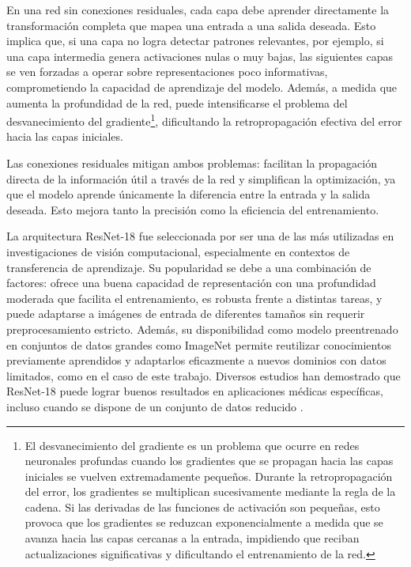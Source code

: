 En una red sin conexiones residuales, cada capa debe aprender directamente la transformación completa que mapea una entrada a una salida deseada. Esto implica que, si una capa no logra detectar patrones relevantes, por ejemplo, si una capa intermedia genera activaciones nulas o muy bajas, las siguientes capas se ven forzadas a operar sobre representaciones poco informativas, comprometiendo la capacidad de aprendizaje del modelo. Además, a medida que aumenta la profundidad de la red, puede intensificarse el problema del desvanecimiento del gradiente\footnote{El desvanecimiento del gradiente es un problema que ocurre en redes neuronales profundas cuando los gradientes que se propagan hacia las capas iniciales se vuelven extremadamente pequeños. Durante la retropropagación del error, los gradientes se multiplican sucesivamente mediante la regla de la cadena. Si las derivadas de las funciones de activación son pequeñas, esto provoca que los gradientes se reduzcan exponencialmente a medida que se avanza hacia las capas cercanas a la entrada, impidiendo que reciban actualizaciones significativas y dificultando el entrenamiento de la red.}, dificultando la retropropagación efectiva del error hacia las capas iniciales.

Las conexiones residuales mitigan ambos problemas: facilitan la propagación directa de la información útil a través de la red y simplifican la optimización, ya que el modelo aprende únicamente la diferencia entre la entrada y la salida deseada. Esto mejora tanto la precisión como la eficiencia del entrenamiento.

La arquitectura ResNet-18 fue seleccionada por ser una de las más utilizadas en investigaciones de visión computacional, especialmente en contextos de transferencia de aprendizaje. Su popularidad se debe a una combinación de factores: ofrece una buena capacidad de representación con una profundidad moderada que facilita el entrenamiento, es robusta frente a distintas tareas, y puede adaptarse a imágenes de entrada de diferentes tamaños sin requerir preprocesamiento estricto. Además, su disponibilidad como modelo preentrenado en conjuntos de datos grandes como ImageNet permite reutilizar conocimientos previamente aprendidos y adaptarlos eficazmente a nuevos dominios con datos limitados, como en el caso de este trabajo. Diversos estudios han demostrado que ResNet-18 puede lograr buenos resultados en aplicaciones médicas específicas, incluso cuando se dispone de un conjunto de datos reducido \parencites{kim2022transfer}.


